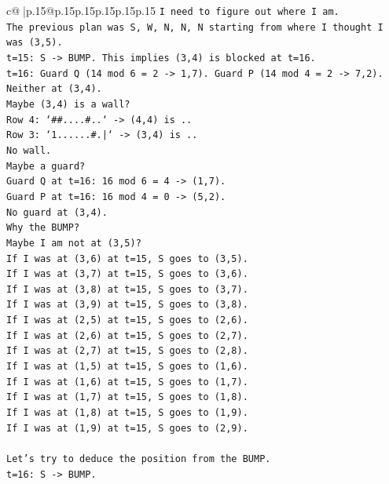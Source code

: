 \documentclass{article}
\begin{document}
{\begin{supertabular}{c@{$\;$}|p{.15\linewidth}@{}p{.15\linewidth}p{.15\linewidth}p{.15\linewidth}p{.15\linewidth}p{.15\linewidth}}
{{{\texttt{I need to figure out where I am.} \\
\texttt{The previous plan was S, W, N, N, N starting from where I thought I was (3,5).} \\
\texttt{t=15: S {-}> BUMP. This implies (3,4) is blocked at t=16.} \\
\texttt{t=16: Guard Q (14 mod 6 = 2 {-}> 1,7). Guard P (14 mod 4 = 2 {-}> 7,2). Neither at (3,4).} \\
\texttt{Maybe (3,4) is a wall?} \\
\texttt{Row 4: `\#\#....\#..` {-}> (4,4) is ..} \\
\texttt{Row 3: `1......\#.|` {-}> (3,4) is ..} \\
\texttt{No wall.} \\
\texttt{Maybe a guard?} \\
\texttt{Guard Q at t=16: 16 mod 6 = 4 {-}> (1,7).} \\
\texttt{Guard P at t=16: 16 mod 4 = 0 {-}> (5,2).} \\
\texttt{No guard at (3,4).} \\
\texttt{Why the BUMP?} \\
\texttt{Maybe I am not at (3,5)?} \\
\texttt{If I was at (3,6) at t=15, S goes to (3,5).} \\
\texttt{If I was at (3,7) at t=15, S goes to (3,6).} \\
\texttt{If I was at (3,8) at t=15, S goes to (3,7).} \\
\texttt{If I was at (3,9) at t=15, S goes to (3,8).} \\
\texttt{If I was at (2,5) at t=15, S goes to (2,6).} \\
\texttt{If I was at (2,6) at t=15, S goes to (2,7).} \\
\texttt{If I was at (2,7) at t=15, S goes to (2,8).} \\
\texttt{If I was at (1,5) at t=15, S goes to (1,6).} \\
\texttt{If I was at (1,6) at t=15, S goes to (1,7).} \\
\texttt{If I was at (1,7) at t=15, S goes to (1,8).} \\
\texttt{If I was at (1,8) at t=15, S goes to (1,9).} \\
\texttt{If I was at (1,9) at t=15, S goes to (2,9).} \\
\\ 
\texttt{Let's try to deduce the position from the BUMP.} \\
\texttt{t=16: S {-}> BUMP.} \\
}}}
\end{supertabular}}
\end{document}
